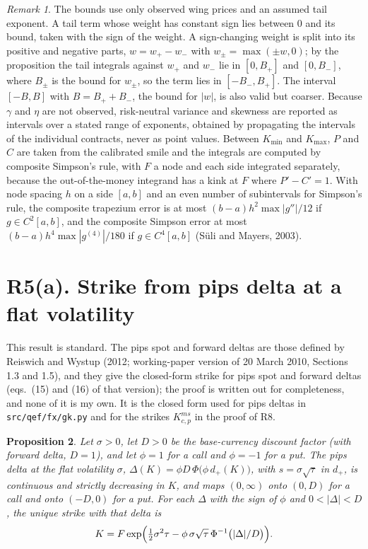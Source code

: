 \documentclass[11pt]{article}
\newtheorem{proposition}{Proposition}
\theoremstyle{remark}
\newtheorem{remark}[proposition]{Remark}
\begin{document}
\begin{remark}
The bounds use only observed wing prices and an assumed tail exponent. A tail term whose weight has constant sign lies between $0$ and its bound, taken with the sign of the weight. A sign-changing weight is split into its positive and negative parts, $w=w_+-w_-$ with $w_\pm=\max(\pm w,0)$; by the proposition the tail integrals against $w_+$ and $w_-$ lie in $[0,B_+]$ and $[0,B_-]$, where $B_\pm$ is the bound for $w_\pm$, so the term lies in $[-B_-,B_+]$. The interval $[-B,B]$ with $B=B_++B_-$, the bound for $|w|$, is also valid but coarser. Because $\gamma$ and $\eta$ are not observed, risk-neutral variance and skewness are reported as intervals over a stated range of exponents, obtained by propagating the intervals of the individual contracts, never as point values. Between $K_{\min}$ and $K_{\max}$, $P$ and $C$ are taken from the calibrated smile and the integrals are computed by composite Simpson's rule, with $F$ a node and each side integrated separately, because the out-of-the-money integrand has a kink at $F$ where $P'-C'=1$. With node spacing $h$ on a side $[a,b]$ and an even number of subintervals for Simpson's rule, the composite trapezium error is at most $(b-a)h^2\max|g''|/12$ if $g\in C^2[a,b]$, and the composite Simpson error at most $(b-a)h^4\max|g^{(4)}|/180$ if $g\in C^4[a,b]$ (S\"uli and Mayers, 2003).
\end{remark}

\section*{R5(a). Strike from pips delta at a flat volatility}

This result is standard. The pips spot and forward deltas are those defined by Reiswich and Wystup (2012; working-paper version of 20 March 2010, Sections 1.3 and 1.5), and they give the closed-form strike for pips spot and forward deltas (eqs.~(15) and (16) of that version); the proof is written out for completeness, and none of it is my own. It is the closed form used for pips deltas in \texttt{src/qef/fx/gk.py} and for the strikes $K^{ms}_{c,p}$ in the proof of R8.

\begin{proposition}
Let $\sigma>0$, let $D>0$ be the base-currency discount factor (with forward delta, $D=1$), and let $\phi=1$ for a call and $\phi=-1$ for a put. The pips delta at the flat volatility $\sigma$, $\Delta(K)=\phi D\,\Phi\bigl(\phi\,d_+(K)\bigr)$, with $s=\sigma\sqrt\tau$ in $d_+$, is continuous and strictly decreasing in $K$, and maps $(0,\infty)$ onto $(0,D)$ for a call and onto $(-D,0)$ for a put. For each $\Delta$ with the sign of $\phi$ and $0<|\Delta|<D$, the unique strike with that delta is
\[
K=F\exp\Bigl(\tfrac12\sigma^2\tau-\phi\,\sigma\sqrt\tau\,\Phi^{-1}\bigl(|\Delta|/D\bigr)\Bigr).
\]
\end{proposition}
\end{document}
